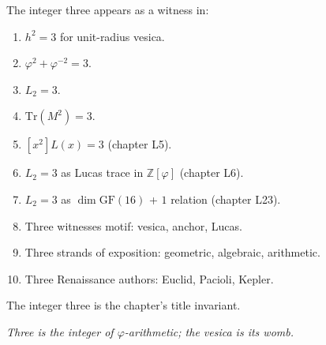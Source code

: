 The integer three appears as a witness in:

\begin{enumerate}
  \item $h^2 = 3$ for unit-radius vesica.
  \item $\varphi^2 + \varphi^{-2} = 3$.
  \item $L_2 = 3$.
  \item $\mathrm{Tr}(M^2) = 3$.
  \item $[x^2] L(x) = 3$ (chapter L5).
  \item $L_2 = 3$ as Lucas trace in $\mathbb{Z}[\varphi]$ (chapter L6).
  \item $L_2 = 3$ as $\dim \mathrm{GF}(16)$ + $1$ relation (chapter L23).
  \item Three witnesses motif: vesica, anchor, Lucas.
  \item Three strands of exposition: geometric, algebraic, arithmetic.
  \item Three Renaissance authors: Euclid, Pacioli, Kepler.
\end{enumerate}

The integer three is the chapter's title invariant.

\bigskip
\centerline{\textit{Three is the integer of $\varphi$-arithmetic; the vesica is its womb.}}
\bigskip

